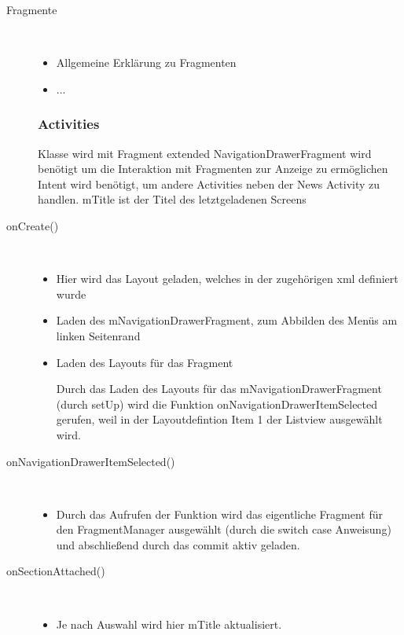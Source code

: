 \begin{description}
 
\item[Fragmente]~\par
\begin{itemize}
\item Allgemeine Erklärung  zu Fragmenten
\item ...
\end{itemize}


\subsubsection{Activities}
Klasse wird mit Fragment extended
NavigationDrawerFragment wird benötigt um die Interaktion mit Fragmenten zur Anzeige zu ermöglichen
Intent wird benötigt, um andere Activities neben der News Activity zu handlen.
mTitle ist der Titel des letztgeladenen Screens
 
\item[onCreate()]~\par
\begin{itemize}
\item Hier wird das Layout geladen, welches in der zugehörigen xml definiert wurde
\item Laden des mNavigationDrawerFragment, zum Abbilden des Menüs am linken Seitenrand
\item Laden des Layouts für das Fragment
 
Durch das Laden des Layouts für das mNavigationDrawerFragment (durch setUp) wird die Funktion onNavigationDrawerItemSelected gerufen, weil in der Layoutdefintion Item 1 der Listview ausgewählt wird.
\end{itemize}
 
\item[onNavigationDrawerItemSelected()]~\par
\begin{itemize}
\item Durch das Aufrufen der Funktion wird das eigentliche Fragment für den FragmentManager ausgewählt (durch die switch case Anweisung) und abschließend durch das commit aktiv geladen.
\end{itemize}

 
\item[onSectionAttached()]~\par
\begin{itemize}
\item Je nach Auswahl wird hier mTitle aktualisiert.
\end{itemize}


\end{description}
